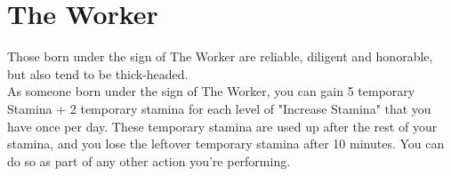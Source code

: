 \section{The Worker}

Those born under the sign of The Worker are reliable, diligent and honorable, but also tend to be thick-headed.\\
As someone born under the sign of The Worker, you can gain 5 temporary Stamina + 2 temporary stamina for each level of "Increase Stamina" that you have once per day. These temporary stamina are used up after the rest of your stamina, and you lose the leftover temporary stamina after 10 minutes. You can do so as part of any other action you're performing.\\